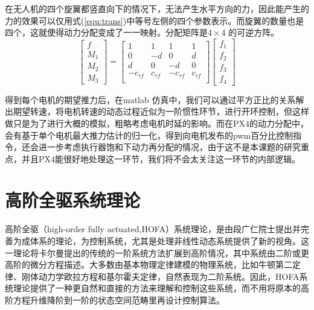 在无人机的四个旋翼都竖直向下的情况下，无法产生水平方向的力，因此能产生的力的效果可以仅用式(\ref{equ:trans})中等号左侧的四个参数表示。而旋翼的数量也是四个，这就使得动力分配变成了一一映射。分配矩阵是$4\times 4$ 的可逆方阵。
\begin{equation}
  \begin{bmatrix}
    f \\
    M_1 \\
     M_2\\M_3
    \end{bmatrix}=\begin{bmatrix}
    1 &1  & 1 & 1 \\
    0 & -d & 0 & d \\
    d & 0 & -d & 0 \\
    -c_{\tau f} & c_{\tau f} & -c_{\tau f} & c_{\tau f} \\
    \end{bmatrix}\begin{bmatrix}
     f_1\\
    f_2 \\
     f_3\\f_4
    \end{bmatrix}   
    \label{equ:trans}
\end{equation}

得到每个电机的期望推力后，在matlab 仿真中，我们可以通过平方正比的关系解出期望转速，将电机转速的动态过程近似为一阶惯性环节，进行开环控制，但这样做只是为了进行大概的模拟，粗略考虑电机时延的影响。而在PX4的动力分配中，会有基于单个电机最大推力估计的归一化，得到向电机发布的pwm百分比控制指令，还会进一步考虑执行器饱和下动力再分配的情况，由于这不是本课题的研究重点，并且PX4能很好地处理这一环节，我们将不会太关注这一环节的内部逻辑。



\section{高阶全驱系统理论}

高阶全驱（high-order fully actuated,HOFA）系统理论\cite{duan1}，是由段广仁院士提出并完善为成体系的理论，为控制系统，尤其是处理非线性动态系统提供了新的视角。这一理论将卡尔曼提出的传统的一阶系统方法扩展到高阶情况，其中系统由二阶或更高阶的微分方程描述。大多数由基本物理定律建模的物理系统，比如牛顿第二定律、刚体动力学欧拉方程和基尔霍夫定律，自然表现为二阶系统。因此，HOFA系统理论提供了一种更自然和直接的方法来理解和控制这些系统，而不用将原本的高阶方程升维降阶到一阶的状态空间范畴里再设计控制算法。

